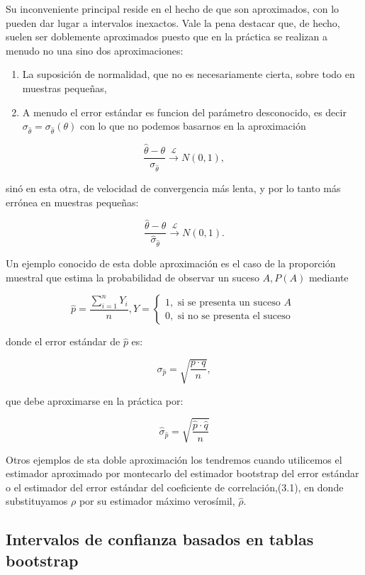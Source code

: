 \documentclass[
]{article}
\providecommand{\tightlist}{%
  \setlength{\itemsep}{0pt}\setlength{\parskip}{0pt}}
\begin{document}
Su inconveniente principal reside en el hecho de que son aproximados, con lo pueden dar lugar a intervalos inexactos. Vale la pena destacar que, de hecho, suelen ser doblemente aproximados puesto que en la práctica se realizan a menudo no una sino dos aproximaciones:

\begin{enumerate}
\def\labelenumi{\arabic{enumi}.}
\tightlist
\item
  La suposición de normalidad, que no es necesariamente cierta, sobre todo en muestras pequeñas,
\item
  A menudo el error estándar es funcion del parámetro desconocido, es decir \(\sigma_{\hat{\theta}}=\sigma_{\hat{\theta}}(\theta)\) con lo que no podemos basarnos en la aproximación
\end{enumerate}

\[
\frac{\hat{\theta}-\theta}{\sigma_{\hat{\theta}}} \xrightarrow{\mathcal{L}} N(0,1),
\]

sinó en esta otra, de velocidad de convergencia más lenta, y por lo tanto más errónea en muestras pequeñas:

\[
\frac{\hat{\theta}-\theta}{\hat{\sigma}_{\hat{\theta}}} \xrightarrow{\mathcal{L}} N(0,1) .
\]

Un ejemplo conocido de esta doble aproximación es el caso de la proporción muestral que estima la probabilidad de observar un suceso \(A, P(A)\) mediante

\[
\hat{p}=\frac{\sum_{i=1}^{n} Y_{i}}{n}, Y=\left\{\begin{array}{l}
1, \text { si se presenta un suceso } A \\
0, \text { si no se presenta el suceso }
\end{array}\right.
\]

donde el error estándar de \(\hat{p}\) es:

\[
\sigma_{\hat{p}}=\sqrt{\frac{p \cdot q}{n}},
\]

que debe aproximarse en la práctica por:

\[
\hat{\sigma}_{\hat{p}}=\sqrt{\frac{\hat{p} \cdot \hat{q}}{n}}
\]

Otros ejemplos de sta doble aproximación los tendremos cuando utilicemos el estimador aproximado por montecarlo del estimador bootstrap del error estándar o el estimador del error estándar del coeficiente de correlación,(3.1), en donde substituyamos \(\rho\) por su estimador máximo verosímil, \(\hat{\rho}\).

\subsection{Intervalos de confianza basados en tablas bootstrap}\label{intervalos-de-confianza-basados-en-tablas-bootstrap}
\end{document}
